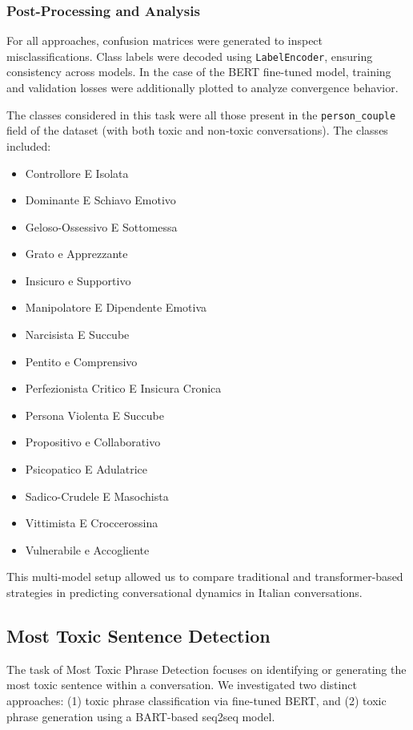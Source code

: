 \documentclass[conference]{IEEEtran}
\begin{document}
\subsubsection{Post-Processing and Analysis}

For all approaches, confusion matrices were generated to inspect misclassifications. Class labels were decoded using \texttt{LabelEncoder}, ensuring consistency across models. In the case of the BERT fine-tuned model, training and validation losses were additionally plotted to analyze convergence behavior. 

The classes considered in this task were all those present in the \texttt{person\_couple} field of the dataset (with both toxic and non-toxic conversations). The classes included:

\begin{itemize}
    \item Controllore E Isolata
    \item Dominante E Schiavo Emotivo
    \item Geloso-Ossessivo E Sottomessa
    \item Grato e Apprezzante
    \item Insicuro e Supportivo
    \item Manipolatore E Dipendente Emotiva
    \item Narcisista E Succube
    \item Pentito e Comprensivo
    \item Perfezionista Critico E Insicura Cronica
    \item Persona Violenta E Succube
    \item Propositivo e Collaborativo
    \item Psicopatico E Adulatrice
    \item Sadico-Crudele E Masochista
    \item Vittimista E Croccerossina
    \item Vulnerabile e Accogliente
\end{itemize}

This multi-model setup allowed us to compare traditional and transformer-based strategies in predicting conversational dynamics in Italian conversations.

\subsection{Most Toxic Sentence Detection}

The task of Most Toxic Phrase Detection focuses on identifying or generating the most toxic sentence within a conversation. We investigated two distinct approaches: (1) toxic phrase classification via fine-tuned BERT, and (2) toxic phrase generation using a BART-based seq2seq model.
\end{document}
